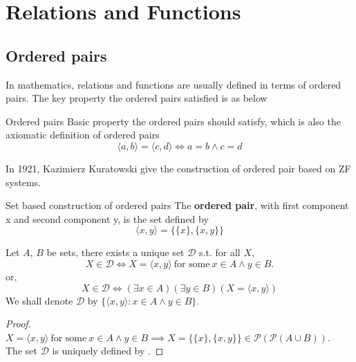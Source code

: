 \section{Relations and Functions}
\subsection{Ordered pairs}
In mathematics, relations and functions are usually defined in terms of ordered pairs. The key property the ordered pairs satisfied is as below
\begin{definition}{Ordered pairs}{}
    Basic property the ordered pairs should satisfy, which is also the axiomatic definition of ordered pairs
    \begin{equation*}
        \langle a,b \rangle = \langle c,d \rangle \iff a = b \land c = d
    \end{equation*}
\end{definition}
In 1921, Kazimierz Kuratowski give the construction of ordered pair based on ZF systems. 
\begin{definition}{Set based construction of ordered pairs}{}
    The \textbf{ordered pair}, with first component x and second component y, is the set defined by
    \begin{equation*}
        \langle x,y \rangle = \{\{x\}, \{x, y\}\}
    \end{equation*}
\end{definition}

\begin{lemma}{}{}
    Let $A$, $B$ be sets, there exists a unique set $\mathcal{D}$ s.t. for all $X$,
    \begin{equation*}
        X \in \mathcal{D} \iff X = \langle x,y \rangle \ \text{for some}\ x \in A \land y \in B.
    \end{equation*}
    or,
    \begin{equation*}
        X \in \mathcal{D} \iff (\exists x \in A)(\exists y \in B)(X = \langle x,y \rangle)
    \end{equation*}
    We shall denote $\mathcal{D}$ by $\{\langle x,y \rangle : x \in A \land y \in B\}$.
\end{lemma}

\begin{proof} 
    $X = \langle x,y \rangle \ \text{for some}\ x \in A \land y \in B \implies X = \{\{x\},\{x,y\}\} \in \mathcal{P}(\mathcal{P}(A \cup B) )$.\\
    The set $\mathcal{D}$ is uniquely defined by .
\end{proof}

